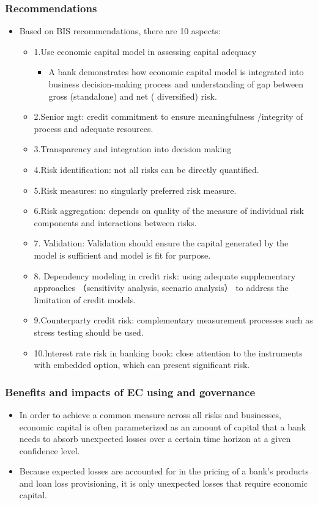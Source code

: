 \subsubsection{Recommendations}
\begin{itemize}
\item Based on BIS recommendations, there are 10 aspects:
    \begin{itemize}
    \item 1.Use economic capital model in assessing capital adequacy
        \begin{itemize}
        \item A bank demonstrates how economic capital model is integrated into business decision-making process and understanding of gap between gross (standalone) and net ( diversified) risk.
        \end{itemize}
        
    \item 2.Senior mgt: credit commitment to ensure meaningfulness /integrity of process and adequate resources.
    \item 3.Transparency and integration into decision making
    \item  4.Risk identification: not all risks can be directly quantified.
    \item 5.Risk measures: no singularly preferred risk measure.
    \item 6.Risk aggregation: depends on quality of the measure of individual risk components and interactions between risks.
    \item 7. Validation: Validation should ensure the capital generated by the model is sufficient and model is fit for purpose.
    \item 8. Dependency modeling in credit risk: using adequate supplementary approaches （sensitivity analysis, scenario analysis） to address the limitation of credit models.
    \item 9.Counterparty credit risk: complementary measurement processes such as stress testing should be used.
    \item 10.lnterest rate risk in banking book: close attention to the instruments with embedded option, which can present significant risk.
    
    
    \end{itemize}
\end{itemize}


\subsubsection{Benefits and impacts of EC using and governance}
\begin{itemize}
\item In order to achieve a common measure across all risks and businesses, economic capital is often parameterized as an amount of capital that a bank needs to absorb unexpected losses over a certain time horizon at a given confidence level.
\item Because expected losses are accounted for in the pricing of a bank's products and loan loss provisioning, it is only unexpected losses that require economic capital.
\end{itemize}


